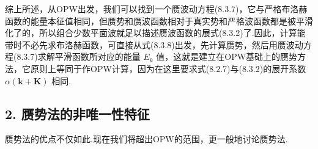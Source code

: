 综上所述，从OPW出发，我们可以找到一个赝波动方程(8.3.7)，它与严格布洛赫函数的能量本征值相同，但赝势和赝波函数相对于真实势和严格波函数都是被平滑化了的，所以组合少数平面波就足以描述赝波函数的展式(8.3.2)了.因此，计算能带时不必先求布洛赫函数，可直接从式(8.3.8)出发，先计算赝势，然后用赝波动方程(8.3.7)求解平滑函数所对应的能量 $E_{k}$ 值，这就是建立在OPW基础上的赝势方法，它原则上等同于作OPW计算，因为在这里要求式(8.2.7)与(8.3.2)的展开系数 $\alpha(\boldsymbol{k}+\boldsymbol{K})$ 相同.

\subsection*{2. 赝势法的非唯一性特征}

赝势法的优点不仅如此.现在我们将超出OPW的范围，更一般地讨论赝势法.

